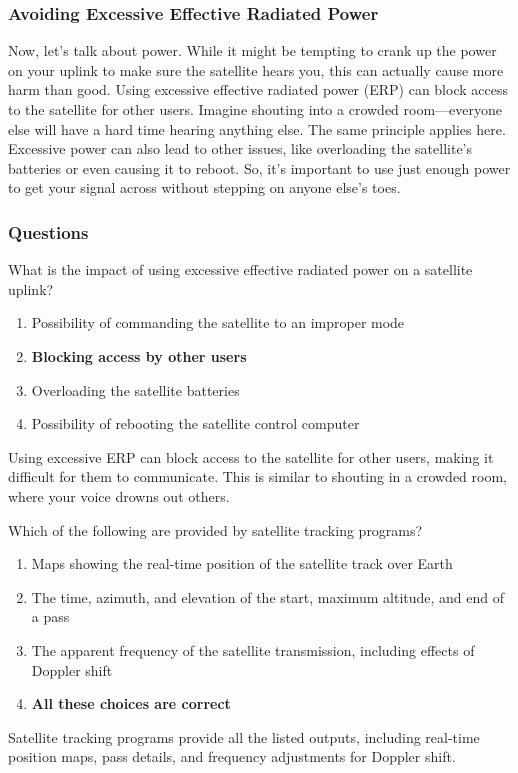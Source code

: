 \subsubsection*{Avoiding Excessive Effective Radiated Power}
Now, let's talk about power. While it might be tempting to crank up the power on your uplink to make sure the satellite hears you, this can actually cause more harm than good. Using excessive effective radiated power (ERP) can block access to the satellite for other users. Imagine shouting into a crowded room—everyone else will have a hard time hearing anything else. The same principle applies here. Excessive power can also lead to other issues, like overloading the satellite's batteries or even causing it to reboot. So, it's important to use just enough power to get your signal across without stepping on anyone else's toes.

\subsubsection*{Questions}

\begin{tcolorbox}[colback=gray!10!white,colframe=black!75!black,title={T8B02}]
What is the impact of using excessive effective radiated power on a satellite uplink?
\begin{enumerate}[label=\Alph*),noitemsep]
    \item Possibility of commanding the satellite to an improper mode
    \item \textbf{Blocking access by other users}
    \item Overloading the satellite batteries
    \item Possibility of rebooting the satellite control computer
\end{enumerate}
\end{tcolorbox}
Using excessive ERP can block access to the satellite for other users, making it difficult for them to communicate. This is similar to shouting in a crowded room, where your voice drowns out others.

\begin{tcolorbox}[colback=gray!10!white,colframe=black!75!black,title={T8B03}]
Which of the following are provided by satellite tracking programs?
\begin{enumerate}[label=\Alph*),noitemsep]
    \item Maps showing the real-time position of the satellite track over Earth
    \item The time, azimuth, and elevation of the start, maximum altitude, and end of a pass
    \item The apparent frequency of the satellite transmission, including effects of Doppler shift
    \item \textbf{All these choices are correct}
\end{enumerate}
\end{tcolorbox}
Satellite tracking programs provide all the listed outputs, including real-time position maps, pass details, and frequency adjustments for Doppler shift.

